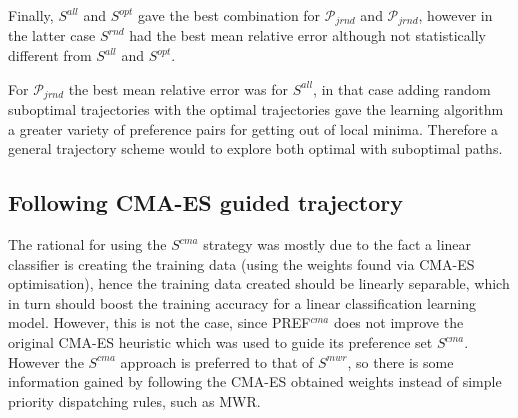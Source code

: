 \documentclass{svjour3}                     %
\begin{document}
Finally, $S^{all}$ and $S^{opt}$ gave the best combination for $\mathcal{P}_{jrnd}$ and $\mathcal{P}_{jrnd}$, however in the latter case $S^{rnd}$ had the best mean relative error although not statistically different from $S^{all}$ and $S^{opt}$. 

For $\mathcal{P}_{jrnd}$  the best mean relative error was for $S^{all}$, in that case adding random suboptimal trajectories with the optimal trajectories gave the learning algorithm a greater variety of preference pairs for getting out of local minima. Therefore a general trajectory scheme would to explore both optimal with suboptimal paths.

\subsection{Following CMA-ES guided trajectory}
The rational for using the $S^{cma}$ strategy was mostly due to the fact a linear classifier is creating the training data (using the weights found via CMA-ES optimisation), hence the training data created should be linearly separable, which in turn should boost the training accuracy for a linear classification learning model. However, this is not the case, since PREF$^{cma}$ does not improve the original CMA-ES heuristic which 
was used to guide its preference set $S^{cma}$. However the $S^{cma}$ approach is preferred to that of $S^{mwr}$, so there is some information gained by following the CMA-ES obtained weights instead of simple priority dispatching rules, such as MWR. 



\end{document}
